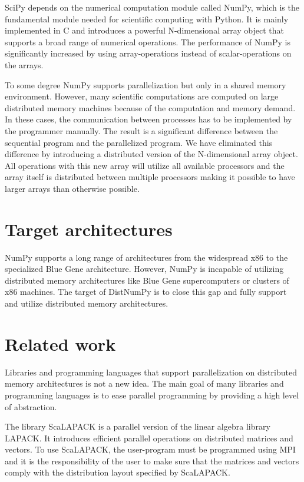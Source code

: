 \documentclass[10pt]{article}
\begin{document}
SciPy depends on the numerical computation module called NumPy\cite{numpy}, which is the fundamental module needed for scientific computing with Python. It is mainly implemented in C and introduces a powerful N-dimensional array object that supports a broad range of numerical operations. The performance of NumPy is significantly increased by using array-operations instead of scalar-operations on the arrays.

To some degree NumPy supports parallelization but only in a shared memory environment. However, many scientific computations are computed on large distributed memory machines because of the computation and memory demand. In these cases, the communication between processes has to be implemented by the programmer manually. The result is a significant difference between the sequential program and the parallelized program. We have eliminated this difference by introducing a distributed version of the N-dimensional array object. All operations with this new array will utilize all available processors and the array itself is distributed between multiple processors making it possible to have larger arrays than otherwise possible.


\section{Target architectures}
NumPy supports a long range of architectures from the widespread x86 to the specialized Blue Gene architecture. However, NumPy is incapable of utilizing distributed memory architectures like Blue Gene supercomputers or clusters of x86 machines. The target of DistNumPy is to close this gap and fully support and utilize distributed memory architectures. 


\section{Related work}
Libraries and programming languages that support parallelization on distributed memory architectures is not a new idea. The main goal of many libraries and programming languages is to ease parallel programming by providing a high level of abstraction. 

The library ScaLAPACK\cite{Blackford96} is a parallel version of the linear algebra library LAPACK\cite{lapack90}. It introduces efficient parallel operations on distributed matrices and vectors. To use ScaLAPACK, the user-program must be programmed using MPI\cite{mpi} and it is the responsibility of the user to make sure that the matrices and vectors comply with the distribution layout specified by ScaLAPACK.
\end{document}
